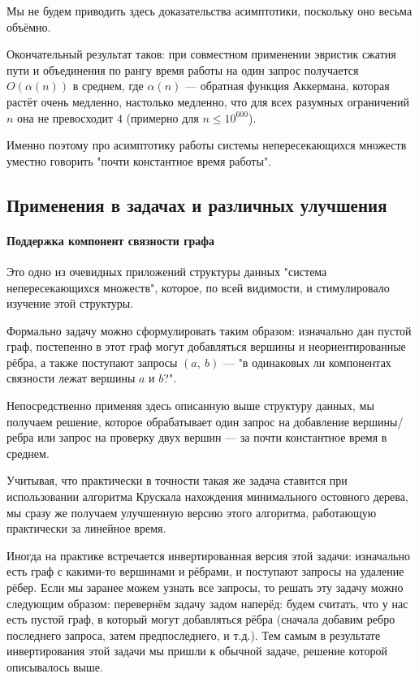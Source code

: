 \documentclass[a4paper,12pt]{article}
\begin{document}
Мы не будем приводить здесь доказательства асимптотики, поскольку оно весьма объёмно.

Окончательный результат таков: при совместном применении эвристик сжатия пути и объединения по рангу время работы на один запрос получается $O (\alpha(n))$ в среднем, где $\alpha(n)$ — обратная функция Аккермана, которая растёт очень медленно, настолько медленно, что для всех разумных ограничений $n$ она не превосходит $4$ (примерно для $n \le 10^{600}$).

Именно поэтому про асимптотику работы системы непересекающихся множеств уместно говорить "почти константное время работы".

\subsection{Применения в задачах и различных улучшения}

\paragraph{Поддержка компонент связности графа}

Это одно из очевидных приложений структуры данных "система непересекающихся множеств", которое, по всей видимости, и стимулировало изучение этой структуры.

Формально задачу можно сформулировать таким образом: изначально дан пустой граф, постепенно в этот граф могут добавляться вершины и неориентированные рёбра, а также поступают запросы $(a,\ b)$ — "в одинаковых ли компонентах связности лежат вершины $a$ и $b$?".

Непосредственно применяя здесь описанную выше структуру данных, мы получаем решение, которое обрабатывает один запрос на добавление вершины/ребра или запрос на проверку двух вершин — за почти константное время в среднем.

Учитывая, что практически в точности такая же задача ставится при использовании алгоритма Крускала нахождения минимального остовного дерева, мы сразу же получаем улучшенную версию этого алгоритма, работающую практически за линейное время.

Иногда на практике встречается инвертированная версия этой задачи: изначально есть граф с какими-то вершинами и рёбрами, и поступают запросы на удаление рёбер. Если мы заранее можем узнать все запросы, то решать эту задачу можно следующим образом: перевернём задачу задом наперёд: будем считать, что у нас есть пустой граф, в который могут добавляться рёбра (сначала добавим ребро последнего запроса, затем предпоследнего, и т.д.). Тем самым в результате инвертирования этой задачи мы пришли к обычной задаче, решение которой описывалось выше.
\end{document}
